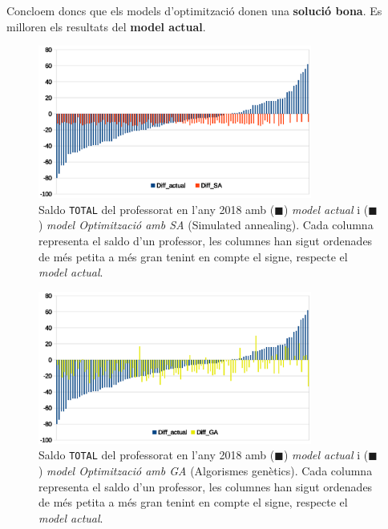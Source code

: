 \documentclass[10pt,twocolumn]{article}
\begin{document}
\normalsize
Concloem doncs que els models d'optimització donen una \textbf{solució bona}. Es milloren els resultats del \textbf{model actual}.
	\begin{figure}[!]
		\centering
		\includegraphics[width=9cm]{sorted_mo}
		\caption{ \small Saldo \texttt{TOTAL}  del professorat en l'any 2018 amb ({\color{blue!70}$\blacksquare$}) \textit{model actual}  i ({\color{orange!70!red!90}$\blacksquare$}) \textit{model Optimització amb SA} (Simulated annealing). Cada columna representa el saldo d'un professor, les columnes han sigut ordenades de més petita a més gran tenint en compte el signe, respecte el \textit{model actual}. }
		\label{fig:6}
	\end{figure}
	\begin{figure}[!]
		\centering
		\includegraphics[width=9cm]{sorted2_mo}
		\caption{ \small Saldo \texttt{TOTAL}  del professorat en l'any 2018 amb ({\color{blue!70}$\blacksquare$}) \textit{model actual}  i ({\color{yellow!70!gray!90}$\blacksquare$}) \textit{model Optimització amb GA} (Algorismes genètics). Cada columna representa el saldo d'un professor, les columnes han sigut ordenades de més petita a més gran tenint en compte el signe, respecte el \textit{model actual}. }
		\label{fig:64}
	\end{figure}
\end{document}
